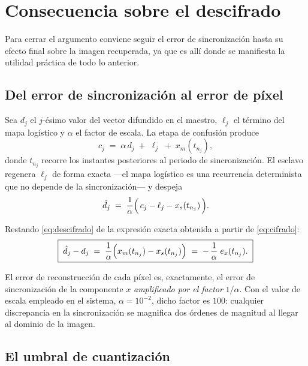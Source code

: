 \documentclass[12pt,a4paper]{article}
\begin{document}
\section{Consecuencia sobre el descifrado}
\label{sec:cripto}

Para cerrar el argumento conviene seguir el error de sincronización hasta su efecto
final sobre la imagen recuperada, ya que es allí donde se manifiesta la utilidad
práctica de todo lo anterior.

\subsection{Del error de sincronización al error de píxel}

Sea $d_j$ el $j$-ésimo valor del vector difundido en el maestro, $\ell_j$ el término
del mapa logístico y $\alpha$ el factor de escala. La etapa de confusión produce
\begin{equation}
\label{eq:cifrado}
  c_j \;=\; \alpha\,d_j \;+\; \ell_j \;+\; x_m(t_{n_j}),
\end{equation}
donde $t_{n_j}$ recorre los instantes posteriores al periodo de sincronización. El
esclavo regenera $\ell_j$ de forma exacta —el mapa logístico es una recurrencia
determinista que no depende de la sincronización— y despeja
\begin{equation}
\label{eq:descifrado}
  \hat{d}_j \;=\; \frac{1}{\alpha}\Bigl(\,c_j - \ell_j - x_s(t_{n_j})\,\Bigr).
\end{equation}

Restando \eqref{eq:descifrado} de la expresión exacta obtenida a partir de
\eqref{eq:cifrado}:
\begin{equation}
\label{eq:error-pixel}
\boxed{\;
  \hat{d}_j - d_j
  \;=\;
  \frac{1}{\alpha}\Bigl(x_m(t_{n_j}) - x_s(t_{n_j})\Bigr)
  \;=\;
  -\,\frac{1}{\alpha}\;e_x(t_{n_j}) .
\;}
\end{equation}

El error de reconstrucción de cada píxel es, exactamente, el error de
sincronización de la componente $x$ \emph{amplificado por el factor} $1/\alpha$.
Con el valor de escala empleado en el sistema, $\alpha = 10^{-2}$, dicho factor es
$100$: cualquier discrepancia en la sincronización se magnifica dos órdenes de
magnitud al llegar al dominio de la imagen.

\subsection{El umbral de cuantización}
\end{document}
